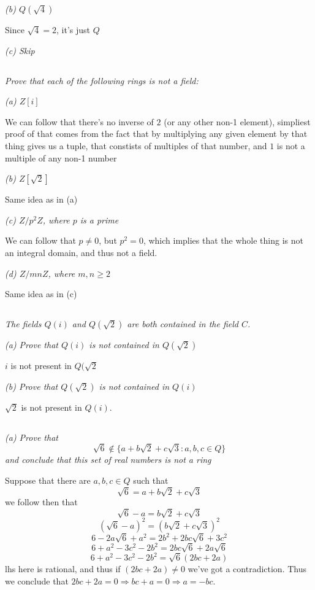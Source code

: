 \documentclass[11pt,oneside,titlepage]{book}
\DeclareMathOperator \ra {\Rightarrow}
\newcommand{\set}[1]{\{ #1 \}}
\begin{document}
\textit{(b) $Q(\sqrt{4})$}

Since $\sqrt{4} = 2$, it's just $Q$

\textit{(c) Skip}

\subsection{}

\textit{Prove that each of the following rings is not a field:}

\textit{(a) $Z[i]$}

We can follow that there's no inverse of $2$ (or any other non-1
element), simpliest proof of that comes from the fact that by
multiplying any given element by that thing gives us a tuple,
that constists of multiples of that number, and $1$ is not a multiple
of any non-1 number

\textit{(b) $Z[\sqrt{2}]$}

Same idea as in (a)

\textit{(c) $Z/p^2Z$, where $p$ is a prime}

We can follow that $p \neq 0$, but $p^2 = 0$, which implies that
the whole thing is not an integral domain, and thus not a field.

\textit{(d) $Z/mnZ$, where $m, n \geq 2$}

Same idea as in (c)

\subsection{}

\textit{The fields $Q(i)$ and $Q(\sqrt{2})$ are both contained in the field $C$.}

\textit{(a) Prove that $Q(i)$ is not contained in $Q(\sqrt{2})$}

$i$ is not present in $Q(\sqrt{2}$

\textit{(b) Prove that $Q(\sqrt{2})$ is not contained in $Q(i)$}

$\sqrt{2}$ is not present in $Q(i)$.

\subsection{}

\textit{(a) Prove that
  $$\sqrt{6} \notin \set{a + b\sqrt{2} + c\sqrt{3}: a, b, c \in Q}$$
  and conclude that this set of real numbers is not a ring }

Suppose that there are $a, b, c \in Q$ such that
$$\sqrt{6} = a + b\sqrt{2} + c\sqrt{3}$$
we follow then that
$$\sqrt{6} - a = b\sqrt{2} + c\sqrt{3}$$
$$(\sqrt{6} - a)^2 = (b\sqrt{2} + c\sqrt{3})^2$$
$$6 - 2a\sqrt{6} + a^2 = 2b^2 + 2bc\sqrt{6} + 3c^2$$
$$6  + a^2 - 3c^2 - 2b^2 = 2bc\sqrt{6} + 2a\sqrt{6} $$
$$6  + a^2 - 3c^2 - 2b^2 = \sqrt{6}(2bc + 2a) $$
lhs here is rational, and thus if $(2bc + 2a) \neq 0$ we've got a contradiction. Thus
we conclude that $2bc + 2a = 0 \ra bc + a = 0 \ra a = -bc$.
\end{document}
